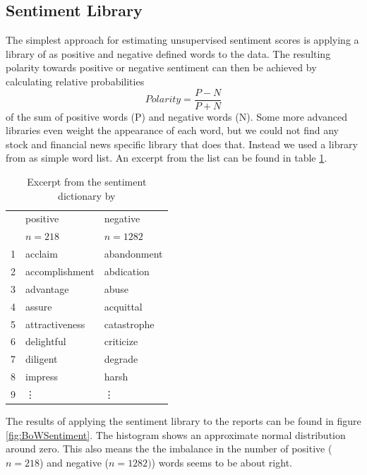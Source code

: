 
\subsection{Sentiment Library}\label{BoW}
The simplest approach for estimating unsupervised sentiment scores is applying a library of as positive and negative defined words to the data. The resulting polarity towards positive or negative sentiment can then be achieved by calculating relative probabilities
\begin{equation}
    Polarity = \frac{P - N}{P + N}
\end{equation}
of the sum of positive words (P) and negative words (N). Some more advanced libraries even weight the appearance of each word, but we could not find any stock and financial news specific library that does that. Instead we used a library from \citet{sent_dictionary} as simple word list. An excerpt from the list can be found in table \ref{tab:sent_dic}. 
\begin{table}[ht]
\centering
\begin{tabular}{rll}
  \hline
 & positive & negative \\ 
 & $n = 218$ & $n = 1282$ \\ 
  \hline
  1 & acclaim & abandonment \\ 
  2 & accomplishment & abdication \\ 
  3 & advantage & abuse \\ 
  4 & assure & acquittal \\ 
  5 & attractiveness & catastrophe \\ 
  6 & delightful & criticize \\ 
  7 & diligent & degrade \\ 
  8 & impress & harsh \\ 
  9 & \vdots & \vdots \\ 
   \hline
\end{tabular}\label{tab:sent_dic}
\caption{Excerpt from the sentiment dictionary by \citet{sent_dictionary}}
\end{table}
The results of applying the sentiment library to the reports can be found in figure \ref{fig:BoWSentiment}. The histogram shows an approximate normal distribution around zero. This also means the the imbalance in the number of positive ($n = 218$) and negative ($n = 1282)$) words seems to be about right.
